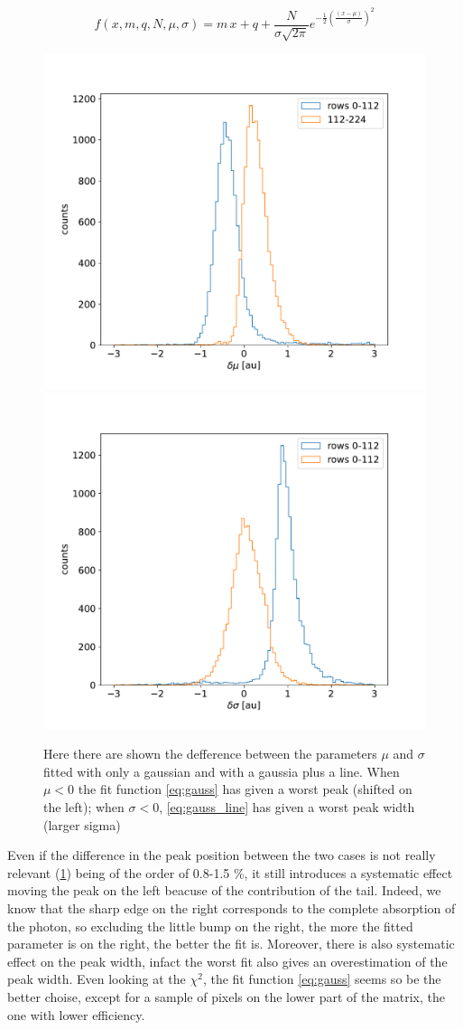         \begin{equation}
            f(x, m, q, N, \mu, \sigma) = m\,x + q + \frac{N}{\sigma \sqrt{2\pi}} e^{-\frac{1}{2}(\frac{(x-\mu)}{\sigma})^2}
            \label{eq:gauss_line}
        \end{equation}          
        \begin{figure}[h!]
            \centering
            \includegraphics[width=.49\linewidth]{figures/charaterization/deltam_Fe.pdf}
            \includegraphics[width=.49\linewidth]{figures/charaterization/deltas_Fe.pdf}
            \caption{Here there are shown the defference between the parameters $\mu$ and $\sigma$ fitted with only a gaussian and with a gaussia plus a line. When $\mu<$0 the fit function \ref{eq:gauss} has given a worst peak (shifted on the left); when $\sigma<0$, \ref{eq:gauss_line} has given a worst peak width (larger sigma)}
            \label{fig:delta_fit}
        \end{figure}           
        Even if the difference in the peak position between the two cases is not really relevant (\ref{fig:delta_fit}) being of the order of 0.8-1.5 \%,  it still introduces a systematic effect moving the peak on the left beacuse of the contribution of the tail. 
        Indeed, we know that the sharp edge on the right corresponds to the complete absorption of the photon, so excluding the little bump on the right, the more the fitted parameter is on the right, the better the fit is. Moreover, there is also systematic effect on the peak width, infact the worst fit also gives an overestimation of the peak width.  
        Even looking at the $\chi^2$, the fit function \ref{eq:gauss} seems so be the better choise, except for a sample of pixels on the lower part of the matrix, the one with lower efficiency.

